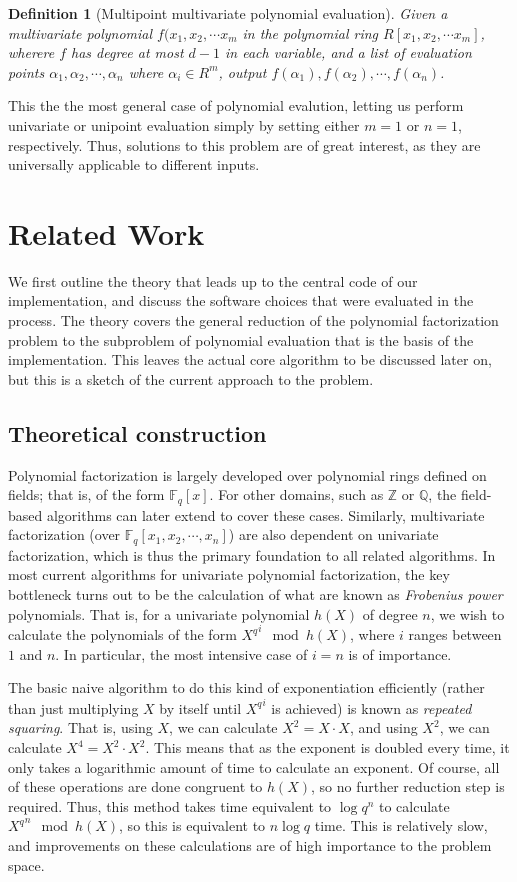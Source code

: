 \documentclass[pageno]{jpaper}
\newtheorem{definition}{Definition}[section]
\begin{document}
\begin{definition}[Multipoint multivariate polynomial evaluation]
  Given a multivariate polynomial $f(x_1, x_2, \cdots x_m$ in the polynomial ring $R[x_1, x_2,\cdots x_m]$, wherere $f$ has degree at most $d-1$ in each variable, and a list of evaluation points $\alpha_1, \alpha_2,\cdots,\alpha_n$ where $\alpha_i \in R^m$, output $f(\alpha_1),f(\alpha_2),\cdots,f(\alpha_n)$.
\end{definition}
This the the most general case of polynomial evalution, letting us perform univariate or unipoint evaluation simply by setting either $m =1$ or $n=1$, respectively.
Thus, solutions to this problem are of great interest, as they are universally applicable to different inputs.

\section{Related Work}
We first outline the theory that leads up to the central code of our implementation, and discuss the software choices that were evaluated in the process.
The theory covers the general reduction of the polynomial factorization problem to the subproblem of polynomial evaluation that is the basis of the implementation.
This leaves the actual core algorithm to be discussed later on, but this is a sketch of the current approach to the problem.

\subsection{Theoretical construction}
Polynomial factorization is largely developed over polynomial rings defined on fields; that is, of the form $\mathbb{F}_q[x]$.
For other domains, such as $\mathbb{Z}$ or $\mathbb{Q}$, the field-based algorithms can later extend to cover these cases.
Similarly, multivariate factorization (over $\mathbb{F}_q[x_1, x_2,\cdots,x_n]$) are also dependent on univariate factorization, which is thus the primary foundation to all related algorithms.
In most current algorithms for univariate polynomial factorization, the key bottleneck turns out to be the calculation of what are known as \emph{Frobenius power} polynomials.
That is, for a univariate polynomial $h(X)$ of degree $n$, we wish to calculate the polynomials of the form ${X^q}^i \mod h(X)$, where $i$ ranges between $1$ and $n$.
In particular, the most intensive case of $i=n$ is of importance.

The basic naive algorithm to do this kind of exponentiation efficiently (rather than just multiplying $X$ by itself until ${X^q}^i$ is achieved) is known as \emph{repeated squaring}.
That is, using $X$, we can calculate $X^2 = X\cdot X$, and using $X^2$, we can calculate $X^4 = X^2\cdot X^2$.
This means that as the exponent is doubled every time, it only takes a logarithmic amount of time to calculate an exponent.
Of course, all of these operations are done congruent to $h(X)$, so no further reduction step is required.
Thus, this method takes time equivalent to $\log q^n$ to calculate ${X^q}^n \mod h(X)$, so this is equivalent to $n\log q$ time.
This is relatively slow, and improvements on these calculations are of high importance to the problem space.
\end{document}
